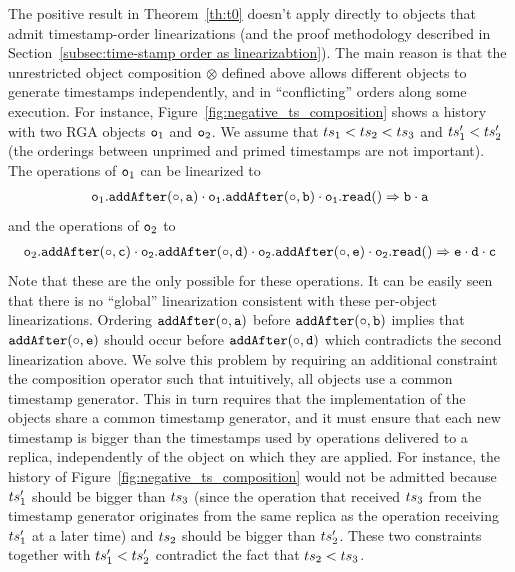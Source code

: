The positive result in Theorem~\ref{th:t0} doesn't apply directly to objects that admit timestamp-order linearizations (and the proof methodology described in Section~\ref{subsec:time-stamp order as linearizabtion}). The main reason is that the unrestricted object composition $\otimes$ defined above allows different objects to generate timestamps independently, and in ``conflicting'' orders along some execution. For instance, Figure~\ref{fig:negative_ts_composition} shows a history with two RGA objects $\mathtt{o}_1$ and $\mathtt{o}_2$. We assume that $ts_1 < ts_2 < ts_3$ and $ts'_1 < ts'_2$ (the orderings between unprimed and primed timestamps are not important). The operations of $\mathtt{o}_1$ can be linearized to
\begin{align*}
\aobj_1.\alabelshort[{\tt addAfter}]{\circ,a}\cdot \aobj_1.\alabelshort[{\tt addAfter}]{\circ,b}\cdot \aobj_1.\alabellongind[{\tt read}]{}{b\cdot a}{}
\end{align*}
and the operations of $\mathtt{o}_2$ to
\begin{align*}
\aobj_2.\alabelshort[{\tt addAfter}]{\circ,c}\cdot \aobj_2.\alabelshort[{\tt addAfter}]{\circ,d}\cdot \aobj_2.\alabelshort[{\tt addAfter}]{\circ,e}\cdot \aobj_2.\alabellongind[{\tt read}]{}{e\cdot d\cdot c}{}
\end{align*}
Note that these are the only  possible for these operations. It can be easily seen that there is no ``global'' linearization consistent with these per-object linearizations. Ordering $\alabelshort[{\tt addAfter}]{\circ,a}$ before $\alabelshort[{\tt addAfter}]{\circ,b}$ implies that $\alabelshort[{\tt addAfter}]{\circ,e}$ should occur before $\alabelshort[{\tt addAfter}]{\circ,d}$ which contradicts the second linearization above.
We solve this problem by requiring an additional constraint the composition operator such that intuitively, all objects use a common timestamp generator. This in turn requires that the implementation of the objects share a common timestamp generator, and it must ensure that each new timestamp is bigger than the  timestamps used by operations delivered to a replica, independently of the object on which they are applied. For instance, the history of Figure~\ref{fig:negative_ts_composition} would not be admitted because $ts_1'$ should be bigger than $ts_3$ (since the operation that received $ts_3$ from the timestamp generator originates from the same replica as the operation receiving $ts_1'$ at a later time) and $ts_2$ should be bigger than $ts_2'$. These two constraints together with $ts_1'<ts_2'$ contradict the fact that $ts_2 < ts_3$.

